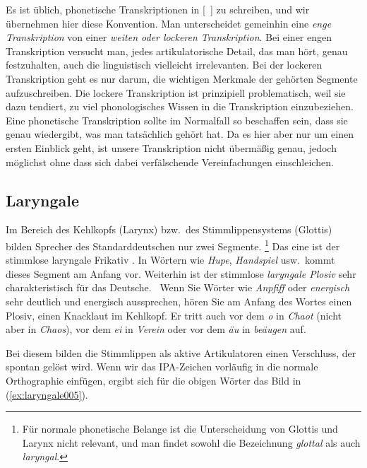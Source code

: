 Es ist üblich, phonetische Transkriptionen in [~] zu schreiben, und wir übernehmen hier diese Konvention.
Man unterscheidet gemeinhin eine \textit{enge Transkription} von einer \textit{weiten oder lockeren Transkription}.
Bei einer engen Transkription versucht man, jedes artikulatorische Detail, das man hört, genau festzuhalten, auch die linguistisch vielleicht irrelevanten.
Bei der lockeren Transkription geht es nur darum, die wichtigen Merkmale der gehörten Segmente aufzuschreiben.
Die lockere Transkription ist prinzipiell problematisch, weil sie dazu tendiert, zu viel phonologisches Wissen in die Transkription einzubeziehen.
Eine phonetische Transkription sollte im Normalfall so beschaffen sein, dass sie genau wiedergibt, was man tatsächlich gehört hat.
Da es hier aber nur um einen ersten Einblick geht, ist unsere Transkription nicht übermäßig genau, jedoch möglichst ohne dass sich dabei verfälschende Vereinfachungen einschleichen.

\subsection{Laryngale}
\label{sec:laryngale}


Im Bereich des Kehlkopfs (Larynx) bzw.\ des Stimmlippensystems (Glottis) bilden Sprecher des Standarddeutschen nur zwei Segmente.%
\footnote{Für normale phonetische Belange ist die Unterscheidung von Glottis und Larynx nicht relevant, und man findet sowohl die Bezeichnung \textit{glottal} als auch \textit{laryngal}.}
Das eine ist der stimmlose laryngale Frikativ \textipa{[h]}.
In Wörtern wie \textit{Hupe}, \textit{Handspiel} usw.\ kommt dieses Segment am Anfang vor.
Weiterhin ist der stimmlose \textit{laryngale Plosiv} \textipa{[P]} sehr charakteristisch für das Deutsche.
\TuBegin~Wenn Sie Wörter wie \textit{Anpfiff} oder \textit{energisch} sehr deutlich und energisch aussprechen, hören Sie am Anfang des Wortes einen Plosiv, einen Knacklaut im Kehlkopf.
Er tritt auch vor dem \textit{o} in \textit{Chaot} (nicht aber in \textit{Chaos}), vor dem \textit{ei} in \textit{Verein} oder vor dem \textit{äu} in \textit{beäugen} auf.

Bei diesem bilden die Stimmlippen als aktive Artikulatoren einen Verschluss, der spontan gelöst wird.
Wenn wir das IPA-Zeichen  vorläufig in die normale Orthographie einfügen, ergibt sich für die obigen Wörter das Bild in (\ref{ex:laryngale005}).

\Enl[2]

